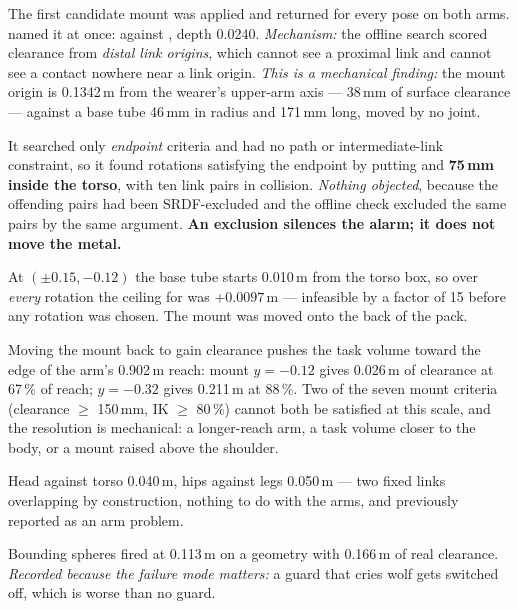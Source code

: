 {The first candidate mount was applied and  returned
 for every pose on both arms.
 named it at once:
 against , depth
0.0240. \textit{Mechanism:} the offline search scored clearance from
\emph{distal link origins}, which cannot see a proximal link and cannot see a
contact nowhere near a link origin. \textit{This is a mechanical finding:} the
mount origin is 0.1342\,m from the wearer's upper-arm axis --- 38\,mm of
surface clearance --- against a base tube 46\,mm in radius and 171\,mm long,
moved by no joint.}

{It searched only \emph{endpoint} criteria and had no path or intermediate-link
constraint, so it found rotations satisfying the endpoint by putting
 and  \textbf{75\,mm inside the torso},
with ten link pairs in collision. \textit{Nothing objected}, because the
offending pairs had been SRDF-excluded and the offline check excluded the same
pairs by the same argument. \textbf{An exclusion silences the alarm; it does
not move the metal.}}

{At $(\pm0.15, -0.12)$ the base tube starts 0.010\,m from the torso box, so
over \emph{every} rotation the ceiling for  was
$+0.0097$\,m --- infeasible by a factor of 15 before any rotation was chosen.
The mount was moved onto the back of the pack.}

{Moving the mount back to gain clearance pushes the task volume toward the edge
of the arm's 0.902\,m reach: mount $y=-0.12$ gives 0.026\,m of clearance at
67\,\% of reach; $y=-0.32$ gives 0.211\,m at 88\,\%. Two of the seven mount
criteria (clearance $\ge$ 150\,mm, IK $\ge$ 80\,\%) cannot both be satisfied at
this scale, and the resolution is mechanical: a longer-reach arm, a task volume
closer to the body, or a mount raised above the shoulder.}

{Head against torso 0.040\,m, hips against legs 0.050\,m --- two fixed links
overlapping by construction, nothing to do with the arms, and previously
reported as an arm problem.}

{Bounding spheres fired at 0.113\,m on a geometry with 0.166\,m of real
clearance. \textit{Recorded because the failure mode matters:} a guard that
cries wolf gets switched off, which is worse than no guard.}

